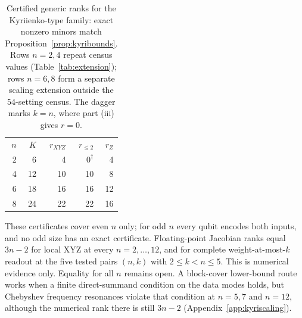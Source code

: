 \begin{table}[t]
\caption{Certified generic ranks for the Kyriienko-type family: exact
nonzero minors match Proposition~\ref{prop:kyribounds}. Rows $n=2,4$
repeat census values (Table~\ref{tab:extension}); rows $n=6,8$ form a
separate scaling extension outside the 54-setting census. The dagger
marks $k=n$, where part (iii) gives $r=0$.}
\label{tab:kyriscaling}
\begin{tabular}{rrrrr}
\toprule
$n$ & $K$ & $r_{XYZ}$ & $r_{\le2}$ & $r_Z$\\
2&6&4&$0^\dagger$&4\\
4&12&10&10&8\\
6&18&16&16&12\\
8&24&22&22&16\\
\bottomrule
\end{tabular}
\end{table}

These certificates cover even $n$ only; for odd $n$ every qubit
encodes both inputs, and no odd size has an exact certificate.
Floating-point Jacobian ranks equal $3n-2$ for local XYZ at every
$n=2,\ldots,12$, and for complete weight-at-most-$k$ readout at the
five tested pairs $(n,k)$ with $2\le k<n\le5$. This is numerical
evidence only.
Equality for all $n$ remains open. A block-cover lower-bound route
works when a finite direct-summand condition on the data modes holds,
but Chebyshev frequency resonances violate that condition at $n=5,7$
and $n=12$, although the numerical rank there is still $3n-2$
(Appendix~\ref{app:kyriscaling}).
